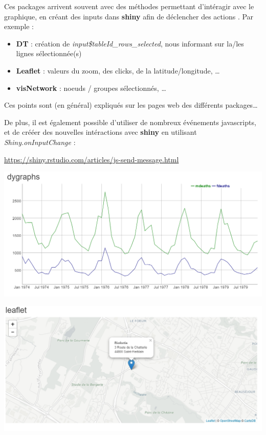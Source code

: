 \documentclass[]{article}
\newenvironment{Shaded}{\begin{snugshade}}{\end{snugshade}}
\newcommand{\KeywordTok}[1]{\textcolor[rgb]{0.13,0.29,0.53}{\textbf{#1}}}
\newcommand{\DataTypeTok}[1]{\textcolor[rgb]{0.13,0.29,0.53}{#1}}
\newcommand{\StringTok}[1]{\textcolor[rgb]{0.31,0.60,0.02}{#1}}
\newcommand{\OperatorTok}[1]{\textcolor[rgb]{0.81,0.36,0.00}{\textbf{#1}}}
\newcommand{\NormalTok}[1]{#1}
\providecommand{\tightlist}{%
  \setlength{\itemsep}{0pt}\setlength{\parskip}{0pt}}
\begin{document}
Ces packages arrivent souvent avec des méthodes permettant d'intéragir
avec le graphique, en créant des inputs dans \textbf{shiny} afin de
déclencher des actions . Par exemple :

\begin{itemize}
\tightlist
\item
  \textbf{DT} : création de \emph{input\$tableId\_rows\_selected}, nous
  informant sur la/les lignes sélectionnée(s)
\item
  \textbf{Leaflet} : valeurs du zoom, des clicks, de la
  latitude/longitude, \ldots{}
\item
  \textbf{visNetwork} : noeuds / groupes sélectionnés, \ldots{}
\end{itemize}

Ces points sont (en général) expliqués sur les pages web des différents
packages\ldots{}

De plus, il est également possible d'utiliser de nombreux événements
javascripts, et de crééer des nouvelles intéractions avec \textbf{shiny}
en utilisant \emph{Shiny.onInputChange} :

\begin{Shaded}
\end{Shaded}

\url{https://shiny.rstudio.com/articles/js-send-message.html}

\includegraphics{img/dygraphs.png}

\includegraphics{img/leaflet.png}
\end{document}
